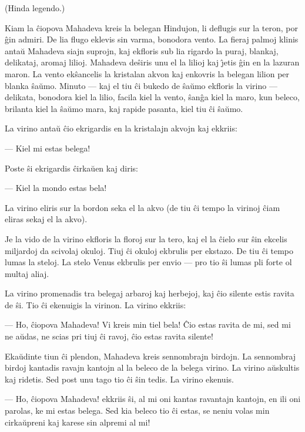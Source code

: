 \begin{center}
\footnotesize (Hinda legendo.)
\end{center}

   Kiam la \^ciopova Mahadeva kreis la belegan Hindujon, li deflugis sur
la teron, por \^gin admiri. De lia flugo eklevis sin varma, bonodora
vento. La fieraj palmoj klinis anta\u u Mahadeva siajn suprojn, kaj
ekfloris sub lia rigardo la puraj, blankaj, delikataj, aromaj
lilioj. Mahadeva de\^siris unu el la lilioj kaj \^{\j}etis \^gin en
la lazuran maron. La vento ek\^sancelis la kristalan akvon kaj
enkovris la belegan lilion per blanka \^sa\u umo. Minuto --- kaj el
tiu \^ci bukedo de \^sa\u umo ekfloris la virino --- delikata,
bonodora kiel la lilio, facila kiel la vento, \^san\^ga kiel la
maro, kun beleco, brilanta kiel la \^sa\u umo mara, kaj rapide
pasanta, kiel tiu \^ci \^sa\u umo.

   La virino anta\u u \^cio ekrigardis en la kristalajn akvojn kaj
ekkriis:

 --- Kiel mi estas belega!

   Poste \^si ekrigardis \^cirka\u uen kaj diris:

 --- Kiel la mondo estas bela!

   La virino eliris sur la bordon seka el la akvo (de tiu \^ci tempo la
virinoj \^ciam eliras sekaj el la akvo).

   Je la vido de la virino ekfloris la floroj sur la tero, kaj el la
\^cielo sur \^sin ekcelis miljardoj da scivolaj okuloj. Tiuj \^ci
okuloj ekbrulis per ekstazo. De tiu \^ci tempo lumas la steloj. La
stelo Venus ekbrulis per envio --- pro tio \^si lumas pli forte ol
multaj aliaj.

   La virino promenadis tra belegaj arbaroj kaj herbejoj, kaj \^cio
silente estis ravita de \^si. Tio \^ci ekenuigis la virinon. La
virino ekkriis:

 --- Ho, \^ciopova Mahadeva! Vi kreis min tiel bela! \^Cio estas ravita
de mi, sed mi ne a\u udas, ne scias pri tiuj \^ci ravoj, \^cio estas
ravita silente!

   Eka\u udinte tiun \^ci plendon, Mahadeva kreis sennombrajn birdojn. La
sennombraj birdoj kantadis ravajn kantojn al la beleco de la belega
virino. La virino a\u uskultis kaj ridetis. Sed post unu tago tio
\^ci \^sin tedis. La virino ekenuis.

 --- Ho, \^ciopova Mahadeva! ekkriis \^si, al mi oni kantas ravantajn
kantojn, en ili oni parolas, ke mi estas belega. Sed kia beleco tio
\^ci estas, se neniu volas min cirka\u upreni kaj karese sin alpremi
al mi!

